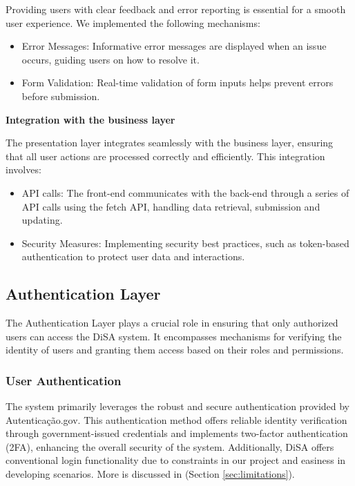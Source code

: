 \documentclass[a4paper,11pt]{article}
\begin{document}
            Providing users with clear feedback and error reporting is essential for a smooth user experience. We implemented the following mechanisms:
            \begin{itemize}
                \item Error Messages: Informative error messages are displayed when an issue occurs, guiding users on how to resolve it.
                \item Form Validation: Real-time validation of form inputs helps prevent errors before submission.
            \end{itemize}
    
            \vspace{0.25cm}\textbf{Integration with the business layer}
    
            The presentation layer integrates seamlessly with the business layer, ensuring that all user actions are processed correctly and efficiently. This integration involves:
            \begin{itemize}
                \item API calls: The front-end communicates with the back-end through a series of API calls using the fetch API, handling data retrieval, submission and updating.
                \item Security Measures: Implementing security best practices, such as token-based authentication to protect user data and interactions.
            \end{itemize}
    
        \subsection{Authentication Layer}
            \quad The Authentication Layer plays a crucial role in ensuring that only authorized users can access the DiSA system. It encompasses mechanisms for verifying the identity of users and granting them access based on their roles and permissions.
            
        \subsubsection{User Authentication}
            \quad The system primarily leverages the robust and secure authentication provided by Autenticação.gov. This authentication method offers reliable identity verification through government-issued credentials and implements two-factor authentication (2FA), enhancing the overall security of the system. Additionally, DiSA offers conventional login functionality due to constraints in our project and easiness in developing scenarios. More is discussed in (Section \ref{sec:limitations}).
            
\end{document}
